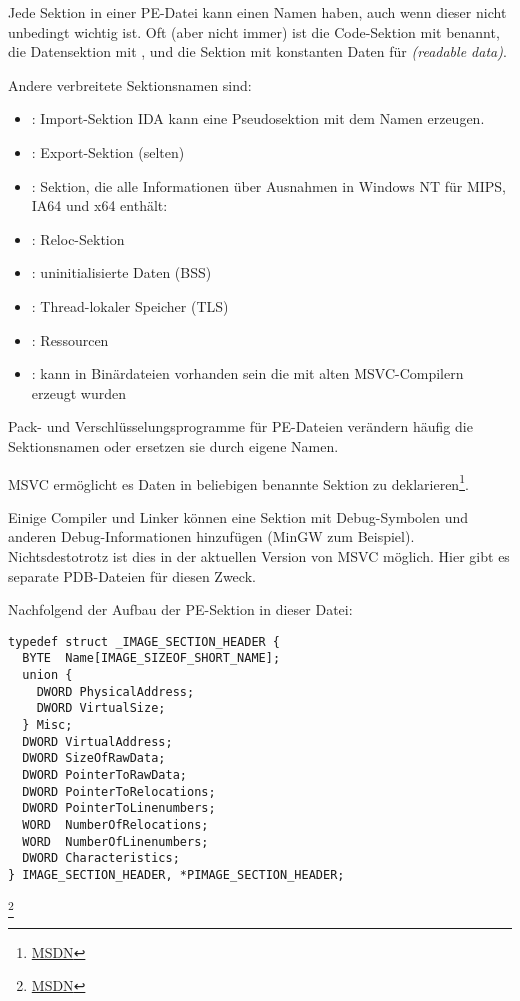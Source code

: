 Jede Sektion in einer PE-Datei kann einen Namen haben, auch wenn dieser nicht
unbedingt wichtig ist.
Oft (aber nicht immer) ist die Code-Sektion mit  benannt, die Datensektion
mit , und die Sektion mit konstanten Daten  für \emph{(readable data)}.

Andere verbreitete Sektionsnamen sind:

\begin{itemize}
\item {}: Import-Sektion
\ac{IDA} kann eine Pseudosektion mit dem Namen  erzeugen.
\item {}: Export-Sektion (selten)
\item {}: Sektion, die alle Informationen über Ausnahmen in Windows NT
für MIPS, \ac{IA64} und x64 enthält: 
\item {}: Reloc-Sektion
\item {}: uninitialisierte Daten (\ac{BSS})
\item {}: Thread-lokaler Speicher (\ac{TLS})
\item {}: Ressourcen
\item {}: kann in Binärdateien vorhanden sein die mit alten MSVC-Compilern
erzeugt wurden
\end{itemize}

Pack- und Verschlüsselungsprogramme für PE-Dateien verändern häufig die Sektionsnamen
oder ersetzen sie durch eigene Namen.

\ac{MSVC} ermöglicht es Daten in beliebigen benannte Sektion zu
deklarieren\footnote{\href{http://msdn.microsoft.com/en-us/library/windows/desktop/cc307397.aspx}{MSDN}}.

Einige Compiler und Linker können eine Sektion mit Debug-Symbolen und anderen
Debug-Informationen hinzufügen (MinGW zum Beispiel).
Nichtsdestotrotz ist dies in der aktuellen Version von \ac{MSVC} möglich.
Hier gibt es separate \gls{PDB}-Dateien für diesen Zweck.

Nachfolgend der Aufbau der PE-Sektion in dieser Datei:

\begin{lstlisting}
typedef struct _IMAGE_SECTION_HEADER {
  BYTE  Name[IMAGE_SIZEOF_SHORT_NAME];
  union {
    DWORD PhysicalAddress;
    DWORD VirtualSize;
  } Misc;
  DWORD VirtualAddress;
  DWORD SizeOfRawData;
  DWORD PointerToRawData;
  DWORD PointerToRelocations;
  DWORD PointerToLinenumbers;
  WORD  NumberOfRelocations;
  WORD  NumberOfLinenumbers;
  DWORD Characteristics;
} IMAGE_SECTION_HEADER, *PIMAGE_SECTION_HEADER;
\end{lstlisting}
\footnote{\href{http://msdn.microsoft.com/en-us/library/windows/desktop/ms680341(v=vs.85).aspx}{MSDN}}

